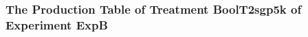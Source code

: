  \begin{frame}
 \fontsize{8pt}{9pt}\selectfont
 \frametitle{ The Production Table of Treatment BoolT2sgp5k of Experiment ExpB }

 \label{ExpBGrammarTable014.tex}  
 \end{frame}

